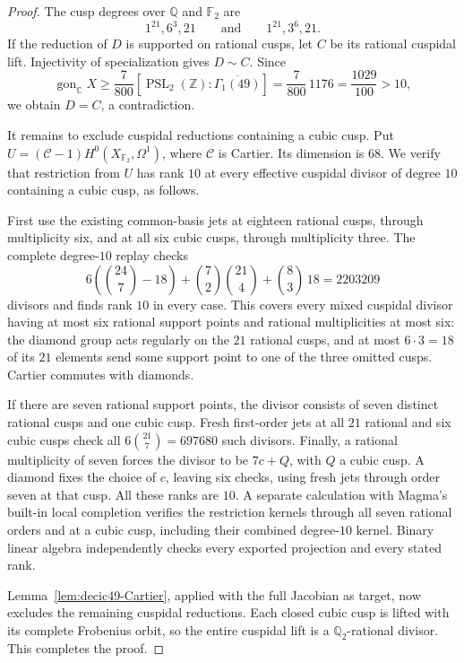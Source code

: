 \begin{proof}
The cusp degrees over $\mathbb Q$ and $\mathbb F_2$ are
\[
 1^{21},6^3,21\qquad\text{and}\qquad1^{21},3^6,21.
\]
If the reduction of $D$ is supported on rational cusps, let $C$
be its rational cuspidal lift. Injectivity of specialization gives
$D\sim C$. Since
\[
 \operatorname{gon}_{\mathbb C}X
 \geq \frac7{800}[\operatorname{PSL}_2(\mathbb Z):\overline{\Gamma_1(49)}]
 =\frac7{800}\,1176=\frac{1029}{100}>10,
\]
we obtain $D=C$, a contradiction.

It remains to exclude cuspidal reductions containing a cubic cusp.
Put $U=(\mathcal C-1)H^0(X_{\mathbb F_2},\Omega^1)$, where
$\mathcal C$ is Cartier. Its dimension is $68$. We verify that
restriction from $U$ has rank $10$ at every effective cuspidal
divisor of degree $10$ containing a cubic cusp, as follows.

First use the existing common-basis jets at eighteen rational
cusps, through multiplicity six, and at all six cubic cusps,
through multiplicity three. The complete degree-$10$ replay checks
\[
 6\left(\binom{24}{7}-18\right)
 +\binom72\binom{21}{4}+\binom83\,18
 =2203209
\]
divisors and finds rank $10$ in every case. This covers every
mixed cuspidal divisor having at most six rational support points
and rational multiplicities at most six: the diamond group acts
regularly on the $21$ rational cusps, and at most $6\cdot3=18$
of its $21$ elements send some support point to one of the three
omitted cusps. Cartier commutes with diamonds.

If there are seven rational support points, the divisor consists
of seven distinct rational cusps and one cubic cusp. Fresh
first-order jets at all $21$ rational and six cubic cusps check
all $6\binom{21}{7}=697680$ such divisors. Finally, a rational
multiplicity of seven forces the divisor to be $7c+Q$, with $Q$
a cubic cusp. A diamond fixes the choice of $c$, leaving six
checks, using fresh jets through order seven at that cusp.
All these ranks are $10$. A separate calculation with Magma's
built-in local completion verifies the restriction kernels through
all seven rational orders and at a cubic cusp, including their
combined degree-$10$ kernel. Binary linear algebra independently
checks every exported projection and every stated rank.

Lemma~\ref{lem:decic49-Cartier}, applied with the full Jacobian as
target, now excludes the remaining cuspidal reductions. Each
closed cubic cusp is lifted with its complete Frobenius orbit,
so the entire cuspidal lift is a $\mathbb Q_2$-rational divisor.
This completes the proof.
\end{proof}
